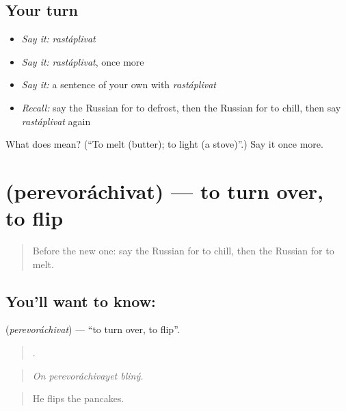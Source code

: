 \subsection*{Your turn}
\begin{itemize}
\raggedright
  \item \emph{Say it:} \emph{rastáplivat}
  \item \emph{Say it:} \emph{rastáplivat}, once more
  \item \emph{Say it:} a sentence of your own with \emph{rastáplivat}
  \item \emph{Recall:} say the Russian for to defrost, then the Russian for to chill, then say \emph{rastáplivat} again
\end{itemize}

\begin{tcolorbox}[breakable,colback=teal!4,colframe=teal!35!black,title={Before you move on}]
What does  mean? (\textquotedblleft{}To melt (butter); to light (a stove)\textquotedblright{}.) Say it once more.
\end{tcolorbox}
\section[\texorpdfstring{\ru{переворачивать} (perevoráchivat)}{переворачивать (perevoráchivat)}]{ (perevoráchivat) — to turn over, to flip}

\label{lesson:RU-C335-perevorachivat}



\begin{quote}
Before the new one: say the Russian for to chill, then the Russian for to melt.
\end{quote}

\subsection*{You'll want to know: }
\textbf{} (\emph{perevoráchivat}) — \textquotedblleft{}to turn over, to flip\textquotedblright{}.

\begin{quote}
  .
\end{quote}

\begin{quote}
\emph{On perevoráchivayet bliný.}
\end{quote}

\begin{quote}
He flips the pancakes.
\end{quote}

